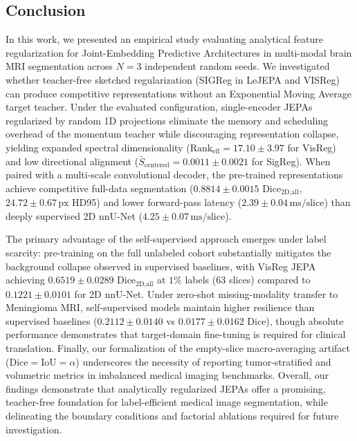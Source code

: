 \documentclass{article}
\begin{document}
\subsection{Conclusion}

In this work, we presented an empirical study evaluating analytical feature regularization for Joint-Embedding Predictive Architectures in multi-modal brain MRI segmentation across $N=3$ independent random seeds. We investigated whether teacher-free sketched regularization (SIGReg in LeJEPA and VISReg) can produce competitive representations without an Exponential Moving Average target teacher. Under the evaluated configuration, single-encoder JEPAs regularized by random 1D projections eliminate the memory and scheduling overhead of the momentum teacher while discouraging representation collapse, yielding expanded spectral dimensionality ($\text{Rank}_{\text{eff}} = 17.10 \pm 3.97$ for VisReg) and low directional alignment ($\bar{S}_{\text{centered}} = 0.0011 \pm 0.0021$ for SigReg). When paired with a multi-scale convolutional decoder, the pre-trained representations achieve competitive full-data segmentation ($0.8814 \pm 0.0015$ $\text{Dice}_{\text{2D,all}}$, $24.72 \pm 0.67\,\text{px}$ HD95) and lower forward-pass latency ($2.39 \pm 0.04\,\text{ms/slice}$) than deeply supervised 2D nnU-Net ($4.25 \pm 0.07\,\text{ms/slice}$).

The primary advantage of the self-supervised approach emerges under label scarcity: pre-training on the full unlabeled cohort substantially mitigates the background collapse observed in supervised baselines, with VisReg JEPA achieving $0.6519 \pm 0.0289$ $\text{Dice}_{\text{2D,all}}$ at $1\%$ labels ($63$ slices) compared to $0.1221 \pm 0.0101$ for 2D nnU-Net. Under zero-shot missing-modality transfer to Meningioma MRI, self-supervised models maintain higher resilience than supervised baselines ($0.2112 \pm 0.0140$ vs $0.0177 \pm 0.0162$ Dice), though absolute performance demonstrates that target-domain fine-tuning is required for clinical translation. Finally, our formalization of the empty-slice macro-averaging artifact ($\text{Dice} = \text{IoU} = \alpha$) underscores the necessity of reporting tumor-stratified and volumetric metrics in imbalanced medical imaging benchmarks. Overall, our findings demonstrate that analytically regularized JEPAs offer a promising, teacher-free foundation for label-efficient medical image segmentation, while delineating the boundary conditions and factorial ablations required for future investigation.
\end{document}
